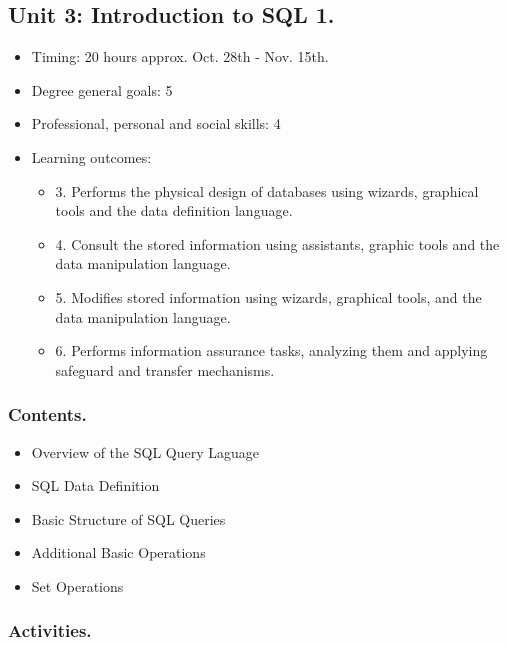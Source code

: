 \documentclass[catalan, a4paper, 12pt, titlepage]{article}
\begin{document}
  \subsection{Unit 3: Introduction to SQL 1.}

  \begin{itemize}
	\item Timing: 20 hours approx. Oct. 28th - Nov. 15th.
	\item Degree general goals: 5
	\item Professional, personal and social skills: 4
	\item Learning outcomes: 
		\begin{itemize}
			\item 3. Performs the physical design of databases using wizards, graphical tools and the data definition language.
			\item 4. Consult the stored information using assistants, graphic tools and the data manipulation language.
			\item 5. Modifies stored information using wizards, graphical tools, and the data manipulation language.
			\item 6. Performs information assurance tasks, analyzing them and applying safeguard and transfer mechanisms.
		\end{itemize}
  \end{itemize}

  \subsubsection{Contents.}
  \begin{itemize}
	  \item Overview of the SQL Query Laguage
	  \item SQL Data Definition
	  \item Basic Structure of SQL Queries
	  \item Additional Basic Operations
	  \item Set Operations
  \end{itemize}

  \subsubsection{Activities.}
\end{document}
